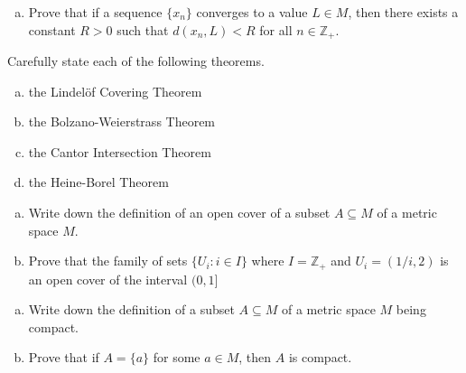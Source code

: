 \documentclass[11pt]{exam}
\theoremstyle{definition}
\begin{document}
\begin{questions}
\begin{enumerate}[(a)]
\item Prove that if a sequence $\{x_n\}$ converges to a value $L\in M$, then there exists a constant $R>0$ such that $d(x_n,L) < R$ for all $n\in\mathbb{Z}_+$.
\end{enumerate}

\newpage
\question[10]\mbox{}
Carefully state each of the following theorems.
\begin{enumerate}[(a)]
\item the Lindel\"{o}f Covering Theorem
\vspace{2in}
\item the Bolzano-Weierstrass Theorem
\vspace{2in}
\item the Cantor Intersection Theorem
\vspace{2in}
\item the Heine-Borel Theorem
\end{enumerate}

\newpage
\question[10]\mbox{}
\begin{enumerate}[(a)]
\item Write down the definition of an open cover of a subset $A\subseteq M$ of a metric space $M$.
\vspace{2in}
\item Prove that the family of sets $\{U_i: i\in I\}$ where $I=\mathbb{Z}_+$ and $U_i = (1/i,2)$ is an open cover of the interval $(0,1]$
\end{enumerate}

\newpage
\question[10]\mbox{}
\begin{enumerate}[(a)]
\item Write down the definition of a subset $A\subseteq M$ of a metric space $M$ being compact.
\vspace{2in}
\item Prove that if $A = \{a\}$ for some $a\in M$, then $A$ is compact.
\end{enumerate}


\end{questions}
\end{document}
